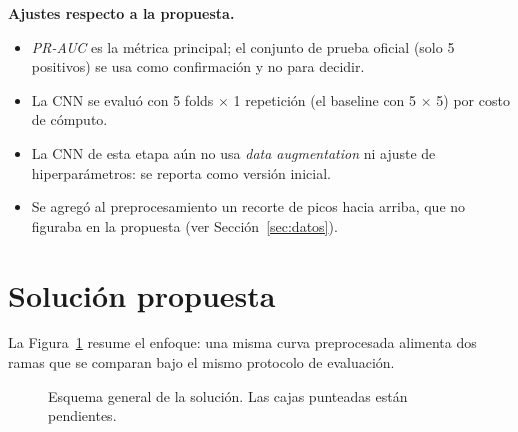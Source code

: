\documentclass[11pt,a4paper]{article}
\begin{document}
\textbf{Ajustes respecto a la propuesta.}
\begin{itemize}
  \item \emph{PR-AUC} es la métrica principal; el conjunto de prueba oficial
  (solo 5 positivos) se usa como confirmación y no para decidir.
  \item La CNN se evaluó con 5 folds $\times$ 1 repetición (el baseline con
  5 $\times$ 5) por costo de cómputo.
  \item La CNN de esta etapa aún no usa \emph{data augmentation} ni ajuste de
  hiperparámetros: se reporta como versión inicial.
  \item Se agregó al preprocesamiento un recorte de picos hacia arriba, que no
  figuraba en la propuesta (ver Sección~\ref{sec:datos}).
\end{itemize}

\section{Solución propuesta}

La Figura~\ref{fig:pipeline} resume el enfoque: una misma curva preprocesada
alimenta dos ramas que se comparan bajo el mismo protocolo de evaluación.

\begin{figure}[h]
\centering
{}
\caption{Esquema general de la solución. Las cajas punteadas están pendientes.}
\label{fig:pipeline}
\end{figure}
\end{document}

